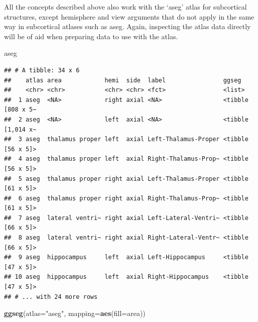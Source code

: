 \documentclass[fleqn,10pt]{wlpeerj} %
\newenvironment{Shaded}{\begin{snugshade}}{\end{snugshade}}
\newcommand{\DataTypeTok}[1]{\textcolor[rgb]{0.13,0.29,0.53}{#1}}
\newcommand{\KeywordTok}[1]{\textcolor[rgb]{0.13,0.29,0.53}{\textbf{#1}}}
\newcommand{\NormalTok}[1]{#1}
\newcommand{\StringTok}[1]{\textcolor[rgb]{0.31,0.60,0.02}{#1}}
\begin{document}
All the concepts described above also work with the `aseg' atlas for subcortical structures, except hemisphere and view arguments that do not apply in the same way in subcortical atlases such as aseg.
Again, inspecting the atlas data directly will be of aid when preparing data to use with the atlas.

\small

\begin{Shaded}
\begin{Highlighting}[]
\NormalTok{aseg}
\end{Highlighting}
\end{Shaded}

\begin{verbatim}
## # A tibble: 34 x 6
##    atlas area            hemi  side  label                ggseg            
##    <chr> <chr>           <chr> <chr> <fct>                <list>           
##  1 aseg  <NA>            right axial <NA>                 <tibble [808 x 5~
##  2 aseg  <NA>            left  axial <NA>                 <tibble [1,014 x~
##  3 aseg  thalamus proper left  axial Left-Thalamus-Proper <tibble [56 x 5]>
##  4 aseg  thalamus proper left  axial Right-Thalamus-Prop~ <tibble [56 x 5]>
##  5 aseg  thalamus proper right axial Left-Thalamus-Proper <tibble [61 x 5]>
##  6 aseg  thalamus proper right axial Right-Thalamus-Prop~ <tibble [61 x 5]>
##  7 aseg  lateral ventri~ right axial Left-Lateral-Ventri~ <tibble [66 x 5]>
##  8 aseg  lateral ventri~ right axial Right-Lateral-Ventr~ <tibble [66 x 5]>
##  9 aseg  hippocampus     left  axial Left-Hippocampus     <tibble [47 x 5]>
## 10 aseg  hippocampus     left  axial Right-Hippocampus    <tibble [47 x 5]>
## # ... with 24 more rows
\end{verbatim}

\normalsize

\begin{Shaded}
\begin{Highlighting}[]
\KeywordTok{ggseg}\NormalTok{(}\DataTypeTok{atlas=}\StringTok{"aseg"}\NormalTok{, }\DataTypeTok{mapping=}\KeywordTok{aes}\NormalTok{(}\DataTypeTok{fill=}\NormalTok{area))}
\end{Highlighting}
\end{Shaded}
\end{document}
